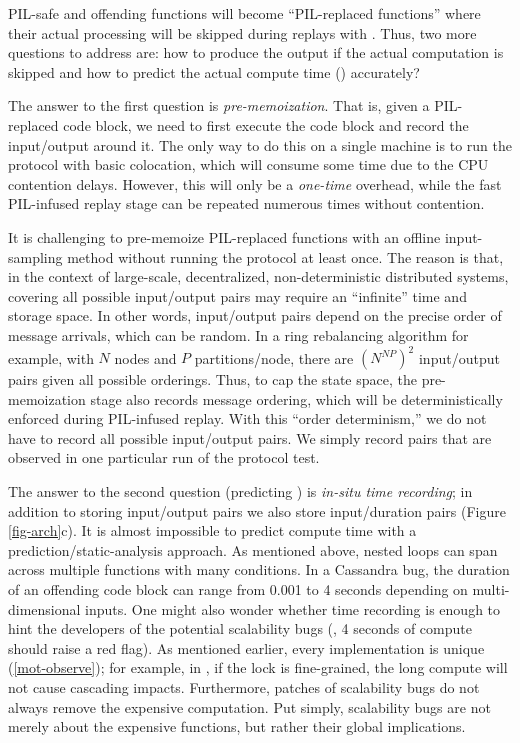 PIL-safe and offending
functions will become ``PIL-replaced functions'' where their actual
processing will be skipped during replays with .
%
Thus, two more questions to address are: how to produce the output if the
actual computation is skipped and how to predict the actual compute time
() accurately?


The answer to the first question is {\em pre-memoization}.  That is, given
a PIL-replaced code block, we need to first execute the code block and
record the input/output around it.
%
The only way to do this on a single machine is to run the protocol with
basic colocation, which will consume some time due to the CPU contention
delays.
%
However, this will only be a {\em one-time} overhead, while the fast
PIL-infused replay stage can be repeated numerous times without
contention.



It is challenging to pre-memoize PIL-replaced functions with an offline
input-sampling method without running the protocol at least once.
%
The reason is that, in the context of large-scale, decentralized,
non-deterministic distributed systems, covering all possible input/output
pairs may require an ``infinite'' time and storage space.
%
In other words, input/output pairs depend on the precise order of message
arrivals, which can be random.
%
In a ring rebalancing algorithm for example, with $N$ nodes and $P$
partitions/node, there are $(N^{NP})^2$ input/output pairs given all
possible orderings.
%
Thus, to cap the state space, the pre-memoization stage also records
message ordering, which will be deterministically enforced during
PIL-infused replay.  With this ``order determinism,'' we do not have to
record all possible input/output pairs.  We simply record pairs that are
observed in one particular run of the protocol test.


The answer to the second question (predicting ) is {\em in-situ time
  recording}; in addition to storing input/output pairs we also store
input/duration pairs (Figure \ref{fig-arch}c).
%
It is almost impossible to predict compute time with a
prediction/static-analysis approach.
%
As mentioned above, nested loops can span across multiple functions with
many  conditions.  In a Cassandra bug, the duration of an
offending code block can range from 0.001 to 4 seconds depending on 
multi-dimensional inputs.
%
One might also wonder whether time recording is enough to hint the
developers of the potential scalability bugs (\eg, 4 seconds of compute
should raise a red flag).
%
As mentioned earlier, every implementation is unique (\sec\ref{mot-observe});
for example, in , if the lock is fine-grained, the long compute
will not cause cascading impacts.
%
Furthermore, patches of scalability bugs do not always remove the
expensive computation.
%
Put simply, scalability bugs are not merely about the expensive functions,
but rather their global implications.





